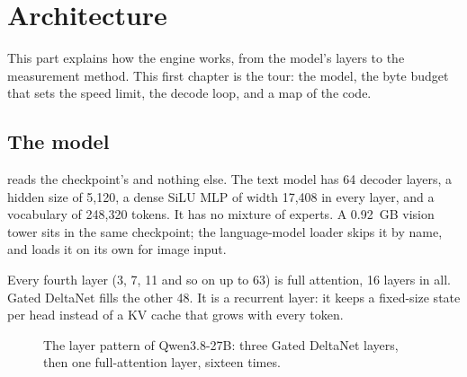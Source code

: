 \chapter{Architecture}\label{ch:architecture}

This part explains how the engine works, from the model's layers to the measurement method. This first chapter is the tour: the model, the byte budget that sets the speed limit, the decode loop, and a map of the code.

\section{The model}

 reads the checkpoint's  and nothing else. The text model has 64 decoder layers, a hidden size of 5,120, a dense SiLU MLP of width 17,408 in every layer, and a vocabulary of 248,320 tokens. It has no mixture of experts. A 0.92~GB vision tower sits in the same checkpoint; the language-model loader skips it by name, and  loads it on its own for image input.

Every fourth layer (3, 7, 11 and so on up to 63) is full attention, 16 layers in all. Gated DeltaNet fills the other 48. It is a recurrent layer: it keeps a fixed-size state per head instead of a KV cache that grows with every token.

\begin{figure}[htbp]
\centering
{}
\caption[The layer pattern of Qwen3.8-27B]{The layer pattern of Qwen3.8-27B: three Gated DeltaNet layers, then one full-attention layer, sixteen times.}\label{fig:layers}
\end{figure}

